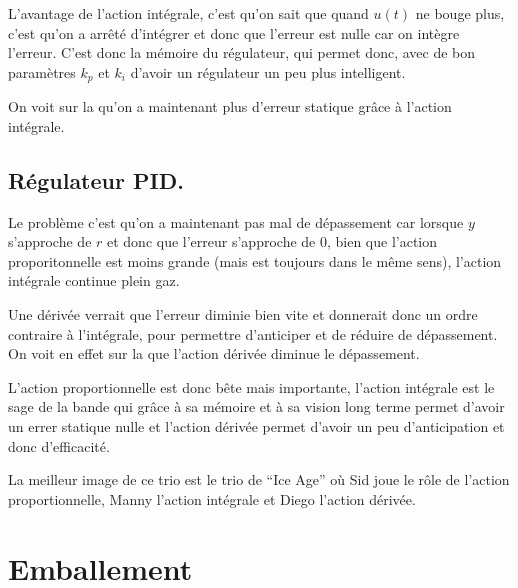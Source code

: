 L'avantage de l'action intégrale, c'est qu'on sait que quand $u(t)$ ne bouge plus,
c'est qu'on a arrêté d'intégrer et donc que l'erreur est nulle car on intègre l'erreur.
C'est donc la mémoire du régulateur, qui permet donc, avec de bon paramètres $k_p$ et $k_i$
d'avoir un régulateur un peu plus intelligent.

On voit sur la  qu'on a maintenant plus d'erreur statique grâce à l'action
intégrale.

\subsection{Régulateur PID.}
Le problème c'est qu'on a maintenant pas mal de dépassement car lorsque $y$ s'approche de $r$
et donc que l'erreur s'approche de 0, bien que l'action proporitonnelle est moins grande
(mais est toujours dans le même sens), l'action intégrale continue plein gaz.

Une dérivée verrait que l'erreur diminie bien vite et donnerait donc un ordre contraire
à l'intégrale, pour permettre d'anticiper et de réduire de dépassement.
On voit en effet sur la  que l'action dérivée diminue le dépassement.

L'action proportionnelle est donc bête mais importante,
l'action intégrale est le sage de la bande qui grâce à sa mémoire et à sa vision
long terme permet d'avoir un errer statique nulle et
l'action dérivée permet d'avoir un peu d'anticipation et donc d'efficacité.

La meilleur image de ce trio est le trio de ``Ice Age'' où Sid joue le rôle de l'action
proportionnelle, Manny l'action intégrale et Diego l'action dérivée.

\section{Emballement}

